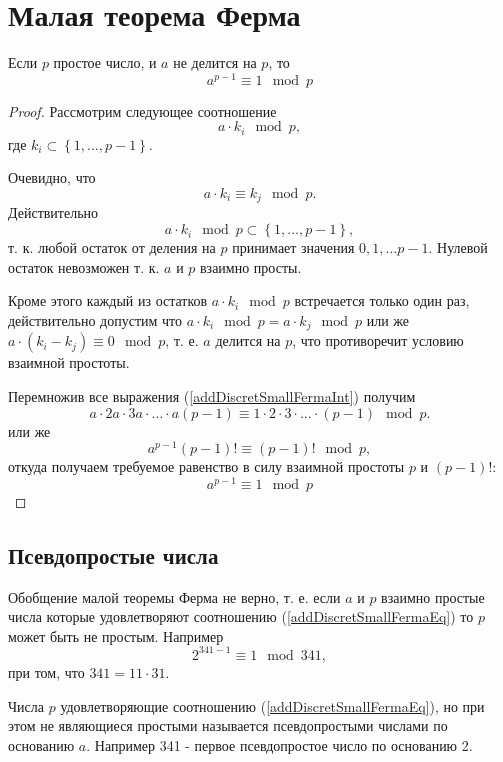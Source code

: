 \section{Малая теорема Ферма}

\begin{theorem}
\label{addDiscretSmallFerma}
Если $p$ простое число, и $a$ не делится на $p$, то 
\begin{equation}
a^{p-1} \equiv 1 \mod{p}
\label{addDiscretSmallFermaEq}
\end{equation}
\end{theorem}

\begin{proof}
Рассмотрим следующее соотношение
\[
a \cdot k_i \mod{p},
\]
где $k_i \subset \left\{1, \dots, p - 1\right\}$.

Очевидно, что 
\begin{equation}
a \cdot k_i \equiv k_j \mod{p}.
\label{addDiscretSmallFermaInt}
\end{equation}
Действительно
\[
a \cdot k_i \mod{p} \subset \left\{1, \dots, p - 1\right\},
\]
т. к. любой остаток от деления на $p$ принимает значения $0, 1, \dots
p-1$. Нулевой остаток невозможен т. к. $a$ и $p$ взаимно просты.

Кроме этого каждый из остатков $a \cdot k_i \mod{p}$ встречается
только один раз, действительно допустим что $a \cdot k_i \mod{p} = a
\cdot k_j \mod{p}$ или же $a \cdot \left( k_i - k_j \right ) \equiv 0
\mod{p}$, т. е. $a$ делится на $p$, что противоречит условию взаимной
простоты. 

Перемножив все выражения (\ref{addDiscretSmallFermaInt}) получим
\[
a \cdot 2a \cdot 3a \cdot \dots \cdot a\left(p - 1\right) 
\equiv 1 \cdot 2 \cdot 3 \cdot \dots \cdot \left(p - 1\right) \mod{p}.
\]
или же
\[
a^{p-1} \left(p - 1\right)! \equiv \left(p - 1\right)! \mod{p},
\]
откуда получаем требуемое равенство в силу взаимной простоты $p$ и
$\left(p-1\right)!$:
\[
a^{p-1} \equiv 1 \mod{p}
\]
\end{proof}

\subsection{Псевдопростые числа}
Обобщение малой теоремы Ферма не верно, т. е.  если $a$ и $p$ взаимно
простые числа которые удовлетворяют соотношению
(\ref{addDiscretSmallFermaEq}) то $p$ может быть не простым. Например
\[
2 ^ {341 - 1} \equiv 1 \mod{ 341 },
\] 
при том, что $341 = 11 \cdot 31$.

Числа $p$ удовлетворяющие соотношению (\ref{addDiscretSmallFermaEq}),
но при этом не являющиеся простыми называется псевдопростыми числами
по основанию $a$. Например 341 - первое псевдопростое число по
основанию 2.
